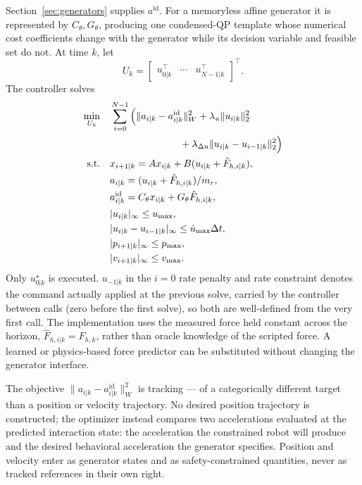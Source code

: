 \documentclass[journal]{IEEEtran}
\begin{document}
Section~\ref{sec:generators} supplies $a^{\mathrm{id}}$. For a memoryless
affine generator it is represented by $C_\theta,G_\theta$, producing one
condensed-QP template whose numerical cost coefficients change with the
generator while its decision variable and feasible set do not. At time
$k$, let
\begin{equation}
U_k= \begin{bmatrix} u_{0|k}^\top&\cdots&u_{N-1|k}^\top \end{bmatrix}^\top.
\end{equation}
The controller solves
\begin{equation}
\begin{aligned}
\min_{U_k}\quad& \sum_{i=0}^{N-1}\Big(
\|a_{i|k}-a_{i|k}^{\mathrm{id}}\|_W^2
+\lambda_u\|u_{i|k}\|_2^2\\
&\hspace{25mm}+\lambda_{\Delta u}
\|u_{i|k}-u_{i-1|k}\|_2^2\Big)\\
\text{s.t.}\quad&x_{i+1|k}=Ax_{i|k}+B(u_{i|k}+\hat F_{h,i|k}),\\
&a_{i|k}=(u_{i|k}+\hat F_{h,i|k})/m_r,\\
&a_{i|k}^{\mathrm{id}} =C_\theta x_{i|k}+G_\theta\hat F_{h,i|k},\\
&|u_{i|k}|_\infty\le u_{\max},\\
&|u_{i|k}-u_{i-1|k}|_\infty \le\dot u_{\max}\Delta t,\\
&|p_{i+1|k}|_\infty\le p_{\max},\\
&|v_{i+1|k}|_\infty\le v_{\max}.
\end{aligned}
\end{equation}
Only $u_{0|k}^\star$ is executed. $u_{-1|k}$ in the $i=0$ rate penalty
and rate constraint denotes the command actually applied at the previous
solve, carried by the controller between calls (zero before the first
solve), so both are well-defined from the very first call. The
implementation uses the measured force held constant across the horizon,
$\hat F_{h,i|k}=F_{h,k}$, rather than oracle knowledge of the scripted
force. A learned or physics-based force predictor can be substituted
without changing the generator interface.

The objective $\|a_{i|k}-a_{i|k}^{\mathrm{id}}\|_W^2$ is tracking --- of a
categorically different target than a position or velocity trajectory.
No desired position trajectory is constructed; the optimizer instead
compares two accelerations evaluated at the predicted interaction state:
the acceleration the constrained robot will produce and the desired
behavioral acceleration the generator specifies. Position and velocity
enter as generator states and as safety-constrained quantities, never as
tracked references in their own right.
\end{document}
